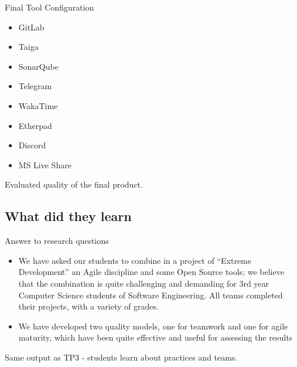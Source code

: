 Final Tool Configuration

\begin{itemize}
    \item GitLab
    \item Taiga
    \item SonarQube
    \item Telegram
    \item WakaTime
    \item Etherpad
    \item Discord
    \item MS Live Share
\end{itemize}

Evaluated quality of the final product.

\subsection{What did they learn}

Answer to research questions

\begin{itemize}
    \item We have asked our students to combine in a project of
“Extreme Development” an Agile discipline and some Open Source tools; we
believe that the combination is quite challenging and demanding for 3rd year
Computer Science students of Software Engineering. All teams completed their
projects, with a variety of grades.
    \item We have developed two quality models, one for teamwork
and one for agile maturity, which have been quite effective and useful for assessing
the results
\end{itemize}

Same output as TP3 - students learn about practices and teams.

